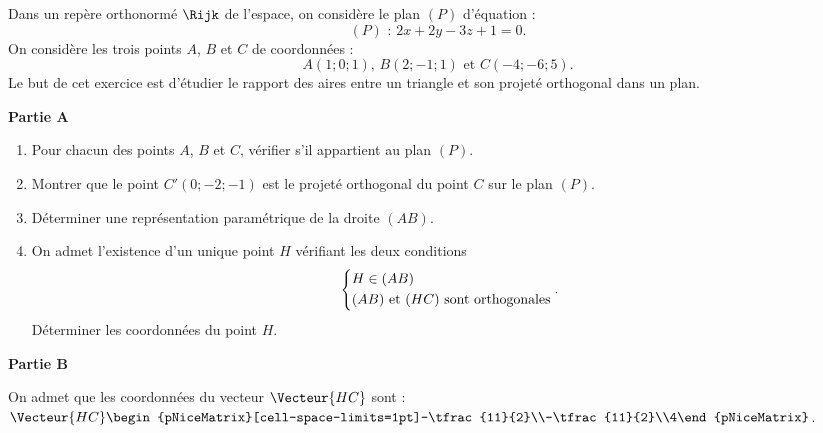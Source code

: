 Dans un repère orthonormé $\Rijk$ de l'espace, on considère le plan $(P)$ d'équation : \[ (P) \text{ : } 2x + 2y - 3z + 1 = 0. \]
%
On considère les trois points $A$, $B$ et $C$ de coordonnées : \[ A(1;0;1)\text{, } B(2;-1;1) \text{ et } C(-4;-6;5). \]
%
Le but de cet exercice est d'étudier le rapport des aires entre un triangle et son projeté orthogonal dans un plan.

\medskip

\textbf{Partie A}

\smallskip

\begin{enumerate}
	\item Pour chacun des points $A$, $B$ et $C$, vérifier s'il appartient au plan $(P)$.
	\item Montrer que le point $C'(0;-2;-1)$ est le projeté orthogonal du point $C$ sur le plan $(P)$.
	\item Déterminer une représentation paramétrique de la droite $(AB)$.
	\item On admet l'existence d'un unique point $H$ vérifiant les deux conditions \[ \begin{dcases} H \in (AB) \\ (AB) \text{ et } (HC) \text{ sont orthogonales} \end{dcases}. \]
	Déterminer les coordonnées du point $H$.
\end{enumerate}

\begin{Centrage}
\end{Centrage}

\textbf{Partie B}

\medskip

On admet que les coordonnées du vecteur $\Vecteur{HC}$ sont : $\Vecteur{HC}\begin{pNiceMatrix}[cell-space-limits=1pt]-\tfrac{11}{2}\\-\tfrac{11}{2}\\4\end{pNiceMatrix}$.

